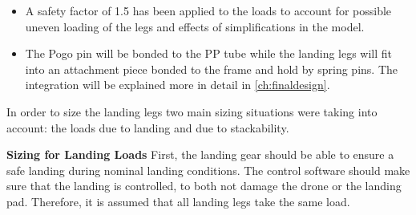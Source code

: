 \begin{itemize}[noitemsep, nolistsep]
    
    
    \item A safety factor of 1.5 has been applied to the loads to account for possible uneven loading of the legs and effects of simplifications in the model.
    
    \item  The Pogo pin will be bonded to the PP tube while the landing legs will fit into an attachment piece bonded to the frame and hold by spring pins. The integration will be explained more in detail in \autoref{ch:finaldesign}.
   
    
\end{itemize}



In order to size the landing legs two main sizing situations were taking into account: the loads due to landing and due to stackability.

\textbf{Sizing for Landing Loads} \newline
First, the landing gear should be able to ensure a safe landing during nominal landing conditions. The control software should make sure that the landing is controlled, to both not damage the drone or the landing pad. Therefore, it is assumed that all landing legs take the same load.

